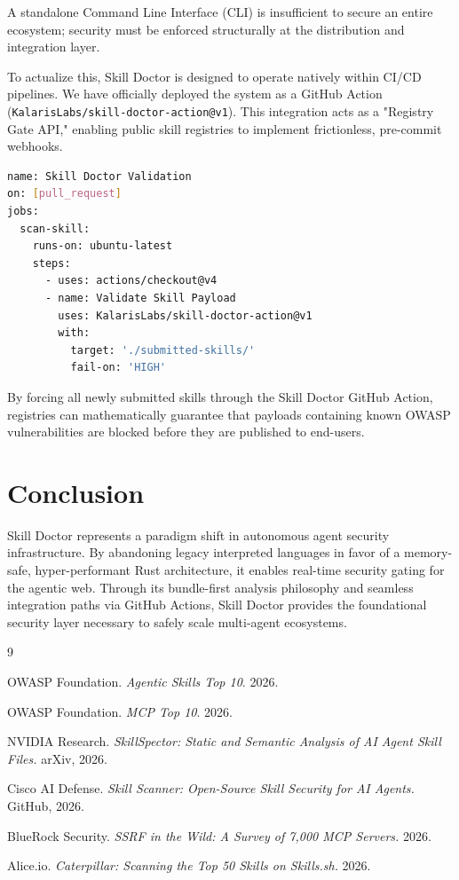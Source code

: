 \documentclass[11pt,a4paper]{article}
\begin{document}
A standalone Command Line Interface (CLI) is insufficient to secure an entire ecosystem; security must be enforced structurally at the distribution and integration layer.

To actualize this, Skill Doctor is designed to operate natively within CI/CD pipelines. We have officially deployed the system as a GitHub Action (\texttt{KalarisLabs/skill-doctor-action@v1}). This integration acts as a "Registry Gate API," enabling public skill registries to implement frictionless, pre-commit webhooks.

\begin{lstlisting}[language=bash, caption={Example YAML for GitHub Actions Registry Gating}]
name: Skill Doctor Validation
on: [pull_request]
jobs:
  scan-skill:
    runs-on: ubuntu-latest
    steps:
      - uses: actions/checkout@v4
      - name: Validate Skill Payload
        uses: KalarisLabs/skill-doctor-action@v1
        with:
          target: './submitted-skills/'
          fail-on: 'HIGH'
\end{lstlisting}

By forcing all newly submitted skills through the Skill Doctor GitHub Action, registries can mathematically guarantee that payloads containing known OWASP vulnerabilities are blocked before they are published to end-users.

\section{Conclusion}

Skill Doctor represents a paradigm shift in autonomous agent security infrastructure. By abandoning legacy interpreted languages in favor of a memory-safe, hyper-performant Rust architecture, it enables real-time security gating for the agentic web. Through its bundle-first analysis philosophy and seamless integration paths via GitHub Actions, Skill Doctor provides the foundational security layer necessary to safely scale multi-agent ecosystems.

\begin{thebibliography}{9}

OWASP Foundation. \textit{Agentic Skills Top 10}. 2026.

OWASP Foundation. \textit{MCP Top 10}. 2026.

NVIDIA Research. \textit{SkillSpector: Static and Semantic Analysis of AI Agent Skill Files.} arXiv, 2026.

Cisco AI Defense. \textit{Skill Scanner: Open-Source Skill Security for AI Agents.} GitHub, 2026.

BlueRock Security. \textit{SSRF in the Wild: A Survey of 7,000 MCP Servers.} 2026.

Alice.io. \textit{Caterpillar: Scanning the Top 50 Skills on Skills.sh.} 2026.

\end{thebibliography}
\end{document}

